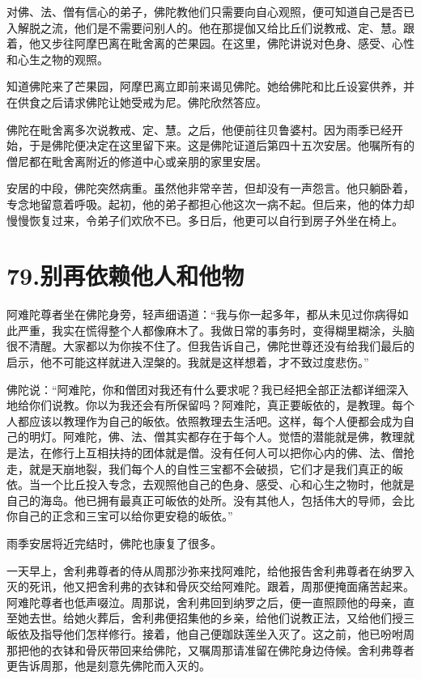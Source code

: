 \documentclass[12pt,twoside,openany]{book}
\begin{document}
对佛、法、僧有信心的弟子，佛陀教他们只需要向自心观照，便可知道自己是否已入解脱之流，他们是不需要问别人的。他在那提伽又给比丘们说教戒、定、慧。跟着，他又步往阿摩巴离在毗舍离的芒果园。在这里，佛陀讲说对色身、感受、心性和心生之物的观照。

知道佛陀来了芒果园，阿摩巴离立即前来谒见佛陀。她给佛陀和比丘设宴供养，并在供食之后请求佛陀让她受戒为尼。佛陀欣然答应。

佛陀在毗舍离多次说教戒、定、慧。之后，他便前往贝鲁婆村。因为雨季已经开始，于是佛陀便决定在这里留下来。这是佛陀证道后第四十五次安居。他嘱所有的僧尼都在毗舍离附近的修道中心或亲朋的家里安居。

安居的中段，佛陀突然病重。虽然他非常辛苦，但却没有一声怨言。他只躺卧着，专念地留意着呼吸。起初，他的弟子都担心他这次一病不起。但后来，他的体力却慢慢恢复过来，令弟子们欢欣不已。多日后，他更可以自行到房子外坐在椅上。


\chapter{79.别再依赖他人和他物}\label{ch79}

阿难陀尊者坐在佛陀身旁，轻声细语道：“我与你一起多年，都从未见过你病得如此严重，我实在慌得整个人都像麻木了。我做日常的事务时，变得糊里糊涂，头脑很不清醒。大家都以为你挨不住了。但我告诉自己，佛陀世尊还没有给我们最后的启示，他不可能这样就进入涅槃的。我就是这样想着，才不致过度悲伤。”

佛陀说：“阿难陀，你和僧团对我还有什么要求呢？我已经把全部正法都详细深入地给你们说教。你以为我还会有所保留吗？阿难陀，真正要皈依的，是教理。每个人都应该以教理作为自己的皈依。依照教理去生活吧。这样，每个人便都会成为自己的明灯。阿难陀，佛、法、僧其实都存在于每个人。觉悟的潜能就是佛，教理就是法，在修行上互相扶持的团体就是僧。没有任何人可以把你心内的佛、法、僧抢走，就是天崩地裂，我们每个人的自性三宝都不会破损，它们才是我们真正的皈依。当一个比丘投入专念，去观照他自己的色身、感受、心和心生之物时，他就是自己的海岛。他已拥有最真正可皈依的处所。没有其他人，包括伟大的导师，会比你自己的正念和三宝可以给你更安稳的皈依。”

雨季安居将近完结时，佛陀也康复了很多。

一天早上，舍利弗尊者的侍从周那沙弥来找阿难陀，给他报告舍利弗尊者在纳罗入灭的死讯，他又把舍利弗的衣钵和骨灰交给阿难陀。跟着，周那便掩面痛苦起来。阿难陀尊者也低声啜泣。周那说，舍利弗回到纳罗之后，便一直照顾他的母亲，直至她去世。给她火葬后，舍利弗便招集他的乡亲，给他们说教正法，又给他们授三皈依及指导他们怎样修行。接着，他自己便跏趺莲坐入灭了。这之前，他已吩咐周那把他的衣钵和骨灰带回来给佛陀，又嘱周那请准留在佛陀身边侍候。舍利弗尊者更告诉周那，他是刻意先佛陀而入灭的。
\end{document}

